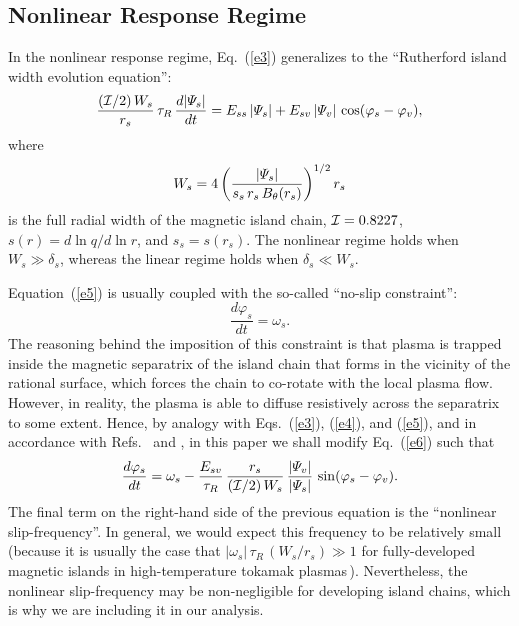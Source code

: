 \documentclass[12pt,prb,aps]{revtex4-1}
\begin{document}
\subsection{Nonlinear Response Regime}
In the nonlinear response regime, Eq.~(\ref{e3}) generalizes to the ``Rutherford island width evolution equation'':\,\cite{ruth,ruth1}
\begin{equation}\label{e5}
\frac{({\cal I}/2)\,W_s}{r_s}\,\tau_R\,\frac{d|{\mit\Psi}_s|}{dt} = E_{ss}\,|{\mit\Psi}_s| + E_{sv}\,|{\mit\Psi}_v|\,\cos(\varphi_s-\varphi_v),
\end{equation}
where
\begin{equation}
W_s = 4\left(\frac{|{\mit\Psi}_s|}{s_s\,r_s\,B_\theta(r_s)}\right)^{1/2} r_s
\end{equation}
is the full radial width of the magnetic island chain, ${\cal I} = 0.8227$, $s(r) = d\ln q/d\ln r$, and $s_s=s(r_s)$. The
nonlinear regime holds when $W_s\gg \delta_s$, whereas the linear regime holds when $\delta_s\ll W_s$. 

Equation~(\ref{e5}) is usually coupled with the so-called ``no-slip constraint'':\,\cite{rfa}
\begin{equation}\label{e6}
\frac{d\varphi_s}{dt} = \omega_s.
\end{equation}
The reasoning behind the imposition of this constraint is that  plasma is trapped inside the
magnetic separatrix of the  island chain that forms in the vicinity of the rational surface,
which forces the chain to co-rotate with the local plasma flow. However, in reality, the plasma
is able to diffuse resistively across the separatrix to some extent. Hence, by analogy with Eqs.~(\ref{e3}), (\ref{e4}), and (\ref{e5}), and 
in accordance with Refs.~ and , in this paper we shall modify Eq.~(\ref{e6}) such that
\begin{equation}\label{e7}
\frac{d\varphi_s}{dt} = \omega_s - \frac{E_{sv}}{\tau_R}\,\frac{r_s}{({\cal I}/2)\,W_s}\,\frac{|{\mit\Psi}_v|}{|{\mit\Psi}_s|}\,\sin(\varphi_s-\varphi_v).
\end{equation}
The final term on the right-hand side of the previous equation is the ``nonlinear slip-frequency''. In general,
we would expect this frequency to be relatively small (because it is usually the case that $|\omega_s|\,\tau_R\,(W_s/r_s)\gg 1$
for fully-developed magnetic islands in high-temperature tokamak plasmas\,\cite{rf1,slip2}). Nevertheless, the
nonlinear slip-frequency may be non-negligible for developing island chains, which is why we are including it in our analysis.
\end{document}
